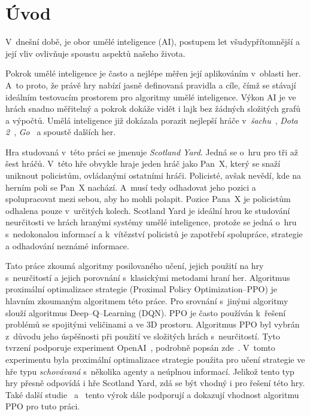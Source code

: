 \newtheorem{definition}{\textbf{Definice}}

\chapter{Úvod}
\label{ch:uvod}

V~dnešní době, je obor umělé inteligence (AI), postupem let všudypřítomnější a její vliv ovlivňuje spoustu aspektů našeho života.

Pokrok umělé inteligence je často a nejlépe měřen její aplikováním v~oblasti her.
A~to proto, že právě hry nabízí jasně definovaná pravidla a cíle, čímž se stávají ideálním testovacím prostorem pro algoritmy umělé inteligence.
Výkon AI je ve hrách snadno měřitelný a pokrok dokáže vidět i lajk bez žádných složitých grafů a výpočtů.
Umělá inteligence již dokázala porazit nejlepší hráče v~\textit{šachu}~\cite{DeepBlue}, \textit{Dota 2}~\cite{Dota2}, \textit{Go}~\cite{AlphaGo} a spoustě dalších her.

Hra studovaná v~této práci se jmenuje \emph{Scotland Yard}.
Jedná se o~hru pro tři až šest hráčů.
V~této hře obvykle hraje jeden hráč jako Pan~X, který se snaží uniknout policistům, ovládanými ostatními hráči.
Policisté, avšak nevědí, kde na herním poli se Pan~X nachází.
A~musí tedy odhadovat jeho pozici a spolupracovat mezi sebou, aby ho mohli polapit.
Pozice Pana~X je policistům odhalena pouze v~určitých kolech.
Scotland Yard je ideální hrou ke studování neurčitosti ve hrách hranými systémy umělé inteligence, protože se jedná o~hru s~nedokonalou informací a k~vítězství policistů je zapotřebí spolupráce, strategie a odhadování neznámé informace.

Tato práce zkoumá algoritmy posilovaného učení, jejich použití na hry s~neurčitostí a jejich porovnání s~klasickými metodami hraní her.
Algoritmus proximální optimalizace strategie (Proximal Policy Optimization--PPO) je hlavním zkoumaným algoritmem této práce.
Pro srovnání s~jinými algoritmy slouží algoritmus Deep--Q--Learning (DQN).
PPO je často používán k~řešení problémů se spojitými veličinami a ve 3D prostoru.
Algoritmus PPO byl vybrán z~důvodu jeho úspěšnosti při použití ve složitých hrách s~neurčitostí.
Tyto tvrzení podporuje experiment OpenAI~\cite{PPO_Hide_Seek_page}, podrobně popsán zde~\cite{PPO_Hide_Seek_paper}.
V~tomto experimentu byla proximální optimalizace strategie použita pro učení strategie ve hře typu \textit{schovávaná} s~několika agenty a neúplnou informací.
Jelikož tento typ hry přesně odpovídá i hře Scotland Yard, zdá se být vhodný i pro řešení této hry.
Také další studie~\cite{Manille} a~\cite{Dota2} tento výrok dále podporují a dokazují vhodnost algoritmu PPO pro tuto práci.


